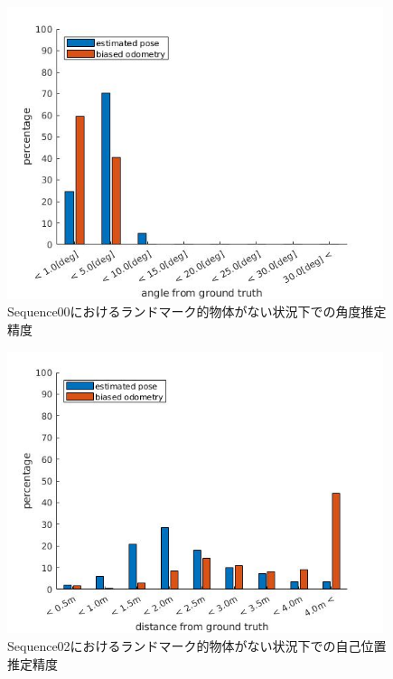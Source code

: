 \begin{figure}[htbp]
 \begin{minipage}{1.0\hsize}
  \begin{center}
   \includegraphics[width=110mm]{./picture/no_car_s0_rpy.jpg}
  \end{center}
  \caption{Sequence00におけるランドマーク的物体がない状況下での角度推定精度}
  \label{fig:no_car_s0_rpy}
 \end{minipage}
\end{figure}

\begin{figure}[htbp]
 \begin{minipage}{1.0\hsize}
  \begin{center}
   \includegraphics[width=110mm]{./picture/no_car_s2_xyz.jpg}
  \end{center}
  \caption{Sequence02におけるランドマーク的物体がない状況下での自己位置推定精度}
  \label{fig:no_car_s2_xyz}
 \end{minipage}
\end{figure}


